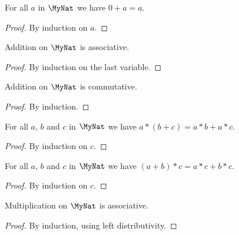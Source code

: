 \begin{lemma}
    \label{MyNat.zero_add}
    \leanok
    For all $a$ in $\MyNat$ we have $0 + a = a$.
\end{lemma}
\begin{proof}
    \leanok
    By induction on $a$.
\end{proof}

\begin{lemma}
    \label{MyNat.add_assoc}
    \leanok
    Addition on $\MyNat$ is associative.
\end{lemma}
\begin{proof}
    \leanok
    By induction on the last variable.
\end{proof}

\begin{lemma}
    \label{MyNat.add_comm}
    \leanok
    Addition on $\MyNat$ is commutative.
\end{lemma}
\begin{proof}
    \leanok
    By induction.
\end{proof}

\begin{lemma}
    \label{MyNat.left_distrib}
    \leanok
    For all $a$, $b$ and $c$ in $\MyNat$ we have $a * (b + c) = a * b + a * c$.
\end{lemma}
\begin{proof}
    \leanok
    By induction on $c$.
\end{proof}

\begin{lemma}
    \label{MyNat.right_distrib}
    \leanok
    For all $a$, $b$ and $c$ in $\MyNat$ we have $(a + b) * c = a * c + b * c$.
\end{lemma}
\begin{proof}
    \leanok
    By induction on $c$.
\end{proof}

\begin{lemma}
    \label{MyNat.mul_assoc}
    \leanok
    Multiplication on $\MyNat$ is associative.
\end{lemma}
\begin{proof}
    \leanok
    By induction, using left distributivity.
\end{proof}

